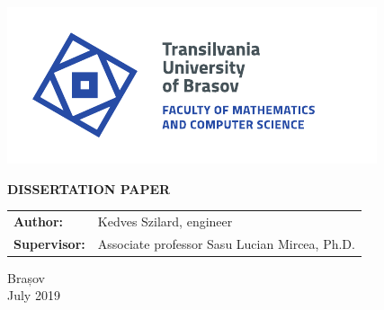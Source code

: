 \begin{titlepage}
	
	\vspace*{-3cm}
	\hspace{-2cm}
	\includegraphics[width=0.8\linewidth]{./images/Logo-UT-MI-SPOT-EN}

	\begin{center}
		\Huge
		
		\vspace{2cm}
		
		\textbf{DISSERTATION PAPER}
		
		\vfill
				
		\Large
		\begin{tabular}{ll}
			\textbf{Author:}&Kedves Szilard, engineer\\
			\textbf{Supervisor:}&Associate professor Sasu Lucian Mircea, Ph.D.
		\end{tabular}
		
		\vfill
		
		\Large
		Brașov\\
		July 2019
        
	\end{center}
\end{titlepage}